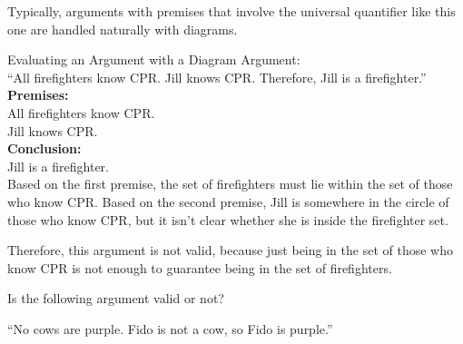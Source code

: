 Typically, arguments with premises that involve the universal quantifier like this one are handled naturally with diagrams.

\begin{example}[https://www.youtube.com/watch?v=HkTBaUzay4g]{Evaluating an Argument with a Diagram}
Argument:\\
``All firefighters know CPR.  Jill knows CPR.  Therefore, Jill is a firefighter.''\\

\textbf{Premises:}\\
All firefighters know CPR.\\
Jill knows CPR.\\

\textbf{Conclusion:}\\
Jill is a firefighter.\\

Based on the first premise, the set of firefighters must lie within the set of those who know CPR.  Based on the second premise, Jill is somewhere in the circle of those who know CPR, but it isn't clear whether she is inside the firefighter set.

\begin{center}
\end{center}

Therefore, this argument is not valid, because just being in the set of those who know CPR is not enough to guarantee being in the set of firefighters.
\end{example}

\begin{try}
Is the following argument valid or not?
\begin{center}
``No cows are purple.  Fido is not a cow, so Fido is purple.''
\end{center}
\end{try}

